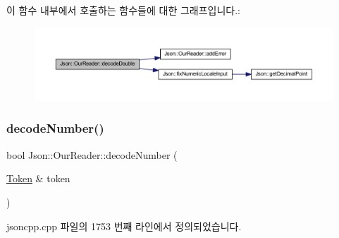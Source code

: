이 함수 내부에서 호출하는 함수들에 대한 그래프입니다.\+:\nopagebreak
\begin{figure}[H]
\begin{center}
\leavevmode
\includegraphics[width=350pt]{class_json_1_1_our_reader_aa5c15a8cd32754f07430dedba3d1308e_cgraph}
\end{center}
\end{figure}
\mbox{\label{class_json_1_1_our_reader_a272d271290933a89abfd5096dd69c9e9}} 
\subsubsection{\texorpdfstring{decode\+Number()}{decodeNumber()}\hspace{0.1cm}{\footnotesize\ttfamily [1/2]}}
{\footnotesize\ttfamily bool Json\+::\+Our\+Reader\+::decode\+Number (\begin{DoxyParamCaption}\item[{\hyperlink{class_json_1_1_our_reader_1_1_token}{Token} \&}]{token }\end{DoxyParamCaption})\hspace{0.3cm}{\ttfamily [private]}}



jsoncpp.\+cpp 파일의 1753 번째 라인에서 정의되었습니다.


